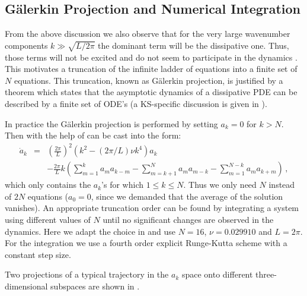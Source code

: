 \documentclass[pre,preprint,groupedaddress,showpacs,showkeys]{revtex4}
\begin{document}
\subsection{G\"{a}lerkin Projection and Numerical Integration}
\label{sec:truncation}

 From the above discussion we also observe that for the very large
 wavenumber components $k\gg\sqrt{L/2\pi}$  the dominant term will be
 the dissipative one. Thus, those terms will not be
 excited and do not seem to participate in the dynamics .
 This motivates a truncation of the infinite ladder of equations
  into a finite set of $N$ equations. This
 truncation, known as G\"{a}lerkin projection, is justified by a theorem
 which states that the asymptotic dynamics of a dissipative PDE can
 be described by a finite set of ODE's (a KS-specific discussion is
 given in \cite{Foias:88}).

 In practice the G\"{a}lerkin projection is performed by setting $a_k=0$ for
 $k>N$. Then  with the help of 
 can be cast into the form:
 \begin{eqnarray}
  \dot{a}_k & = & \left(\frac{2\pi}{L}\right)^2\left(k^2- \left(2\pi/L\right)\nu k^4\right)a_k  \nonumber \\
            &  & - \frac{2\pi}{L} k\left( \sum_{m=1}^{k}a_m a_{k-m}-\sum_{m=k+1}^{N}a_m a_{m-k}
                    -\sum_{m=1}^{N-k}a_m a_{k+m}\right) \, ,
  \label{eq:Fcoef Trunc}
 \end{eqnarray}
 which only contains the $a_k$'s for which $1 \leq k \leq N$. Thus we only need $N$
 instead of $2N$ equations ($a_0=0$, since we demanded that the average of the solution
 vanishes). An appropriate truncation order can be found by integrating
 a system using different values of $N$ until no significant changes
 are observed in the dynamics. Here we adapt the choice in
 \cite{Christiansen:97} and use $N=16$,
 $\nu=0.029910$ and $L=2\pi$. For the integration we use a fourth
 order explicit Runge-Kutta scheme with a constant step size.

 Two projections of a typical trajectory in the $a_k$ space onto different three-dimensional
 subspaces are shown in  .
\end{document}
